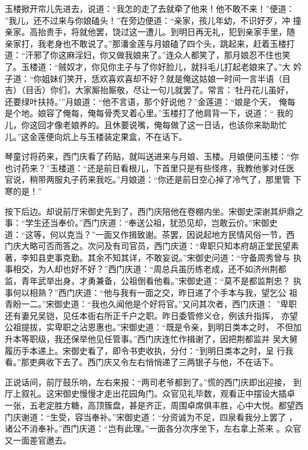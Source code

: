 玉楼掀开帘儿先进去，说道：“我怎的走了去就牵了他来！他不敢不来！”便道：
”我儿，还不过来与你娘磕头！”在旁边便道：“亲家，孩儿年幼，不识好歹，冲
撞亲家。高抬贵手，将就他罢，饶过这一遭儿。到明日再无礼，犯到亲家手里，随
亲家打，我老身也不敢说了。”那潘金莲与月娘磕了四个头，跳起来，赶着玉楼打
道：“汗邪了你这麻淫妇，你又做我娘来了。”连众人都笑了，那月娘忍不住也笑
了。玉楼道：“贼奴才，你见你主子与了你好脸儿，就抖毛儿打起老娘来了。”大
妗子道：“你姐妹们笑开，恁欢喜欢喜却不好？就是俺这姑娘一时间一言半语（目
吉）（目舌）你们，大家厮抬厮敬，尽让一句儿就罢了。常言：'牡丹花儿虽好，
还要绿叶扶持。'”月娘道：“他不言语，那个好说他？”金莲道：“娘是个天，
俺每是个地。娘容了俺每，俺每骨秃叉着心里。”玉楼打了他肩背一下，说道：“
我的儿，你这回才像老娘养的。且休要说嘴，俺每做了这一日话，也该你来助助忙
儿。”这金莲便向炕上与玉楼装定果盒，不在话下。

琴童讨将药来，西门庆看了药贴，就叫送进来与月娘、玉楼。月娘便问玉楼：“你
也讨药来？”玉楼道：“还是前日看根儿，下首里只是有些怪疼，我教他爹对任医
官说，稍带两服丸子药来我吃。”月娘道：“你还是前日空心掉了冷气了，那里管
下寒的是！”

按下后边。却说前厅宋御史先到了，西门庆陪他在卷棚内坐。宋御史深谢其炉鼎之
事：“学生还当奉价。”西门庆道：“奉送公祖，犹恐见却，岂敢云价。”宋御史
道：“这等，何以克当？”一面又作揖致谢。茶罢，因说起地方民情风俗一节，西
门庆大略可否而答之。次问及有司官员，西门庆道：“卑职只知本府胡正堂民望素
著，李知县吏事克勤。其余不知其详，不敢妄说。”宋御史问道：“守备周秀曾与
执事相交，为人却也好不好？”西门庆道：“周总兵虽历练老成，还不如济州荆都
监，青年武举出身，才勇兼备，公祖倒看他看。”宋御史道：“莫不是都监荆忠？
执事何以相熟？”西门庆道：“他与我有一面之交，昨日递了个手本与我，望乞公
祖青盼一二。”宋御史道：“我也久闻他是个好将官。”又问其次者，西门庆道：
”卑职还有妻兄吴铠，见任本衙右所正千户之职。昨日委管修义仓，例该升指挥，
亦望公祖提拔，实卑职之沾恩惠也。”宋御史道：“既是令亲，到明日类本之时，
不但加升本等职级，我还保举他见任管事。”西门庆连忙作揖谢了，因把荆都监并
吴大舅履历手本递上。宋御史看了，即令书吏收执，分付：“到明日类本之时，呈
行我看。”那吏典收下去了。西门庆又令左右悄悄递了三两银子与他，不在话下。

正说话间，前厅鼓乐响，左右来报：“两司老爷都到了。”慌的西门庆即出迎接，
到厅上叙礼。这宋御史慢慢才走出花园角门。众官见礼毕数，观看正中摆设大插卓
一张，五老定胜方糖，高顶簇盘，甚是齐正，周围卓席俱丰胜，心中大悦。都望西
门庆谢道：“生受，容当奉补。”宋御史道：“分资诚为不足，四泉看我分上罢了
，诸公不消奉补。”西门庆道：“岂有此理。”一面各分次序坐下，左右拿上茶来
。众官又一面差官邀去。

